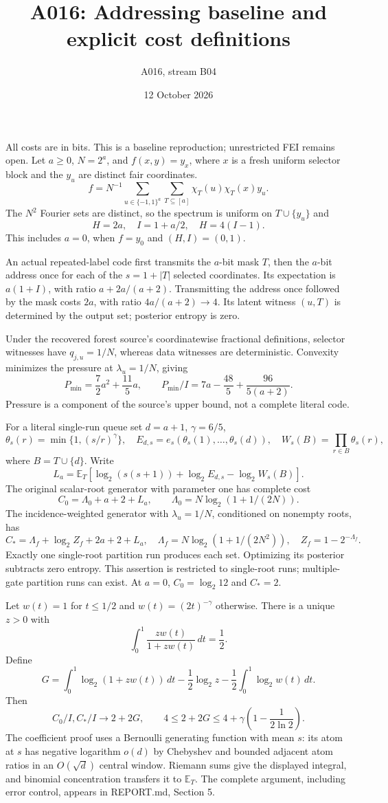 \documentclass[11pt]{article}
\begin{document}
\title{A016: Addressing baseline and explicit cost definitions}
\author{A016, stream B04}\date{12 October 2026}\maketitle
All costs are in bits. This is a baseline reproduction; unrestricted FEI remains open.
Let $a\geq0$, $N=2^a$, and $f(x,y)=y_x$, where $x$ is a fresh uniform selector block and the $y_u$ are distinct fair coordinates.
\[
f=N^{-1}\sum_{u\in\{-1,1\}^a}\sum_{T\subseteq[a]}\chi_T(u)\chi_T(x)y_u.
\]
The $N^2$ Fourier sets are distinct, so the spectrum is uniform on $T\cup\{y_u\}$ and
\[
H=2a,\quad I=1+a/2,\quad H=4(I-1).
\]
This includes $a=0$, when $f=y_0$ and $(H,I)=(0,1)$.

An actual repeated-label code first transmits the $a$-bit mask $T$, then the $a$-bit address once for each of the $s=1+|T|$ selected coordinates. Its expectation is $a(1+I)$, with ratio $a+2a/(a+2)$. Transmitting the address once followed by the mask costs $2a$, with ratio $4a/(a+2)\to4$. Its latent witness $(u,T)$ is determined by the output set; posterior entropy is zero.

Under the recovered forest source's coordinatewise fractional definitions, selector witnesses have $q_{j,u}=1/N$, whereas data witnesses are deterministic. Convexity minimizes the pressure at $\lambda_u=1/N$, giving
\[
P_{\min}=\frac72a^2+\frac{11}{5}a,\qquad
P_{\min}/I=7a-\frac{48}{5}+\frac{96}{5(a+2)}.
\]
Pressure is a component of the source's upper bound, not a complete literal code.

For a literal single-run queue set $d=a+1$, $\gamma=6/5$,
\[
\theta_s(r)=\min\{1,(s/r)^\gamma\},\quad
E_{d,s}=e_s(\theta_s(1),\ldots,\theta_s(d)),\quad
W_s(B)=\prod_{r\in B}\theta_s(r),
\]
where $B=T\cup\{d\}$. Write
\[
L_a=\mathbb E_T\left[\log_2(s(s+1))+\log_2 E_{d,s}-\log_2 W_s(B)\right].
\]
The original scalar-root generator with parameter one has complete cost
\[
C_0=\Lambda_0+a+2+L_a,\qquad
\Lambda_0=N\log_2(1+1/(2N)).
\]
The incidence-weighted generator with $\lambda_u=1/N$, conditioned on nonempty roots, has
\[
C_* =\Lambda_f+\log_2 Z_f+2a+2+L_a,
\quad \Lambda_f=N\log_2(1+1/(2N^2)),\quad Z_f=1-2^{-\Lambda_f}.
\]
Exactly one single-root partition run produces each set. Optimizing its posterior subtracts zero entropy. This assertion is restricted to single-root runs; multiple-gate partition runs can exist. At $a=0$, $C_0=\log_2 12$ and $C_*=2$.

Let $w(t)=1$ for $t\leq1/2$ and $w(t)=(2t)^{-\gamma}$ otherwise. There is a unique $z>0$ with
\[
\int_0^1\frac{zw(t)}{1+zw(t)}\,dt=\frac12.
\]
Define
\[
G=\int_0^1\log_2(1+zw(t))\,dt-\frac12\log_2z
-\frac12\int_0^1\log_2w(t)\,dt.
\]
Then
\[
C_0/I,C_*/I\longrightarrow2+2G,\qquad
4\leq2+2G\leq4+\gamma\left(1-\frac1{2\ln2}\right).
\]
The coefficient proof uses a Bernoulli generating function with mean $s$: its atom at $s$ has negative logarithm $o(d)$ by Chebyshev and bounded adjacent atom ratios in an $O(\sqrt d)$ central window. Riemann sums give the displayed integral, and binomial concentration transfers it to $\mathbb E_T$. The complete argument, including error control, appears in REPORT.md, Section 5.
\end{document}
